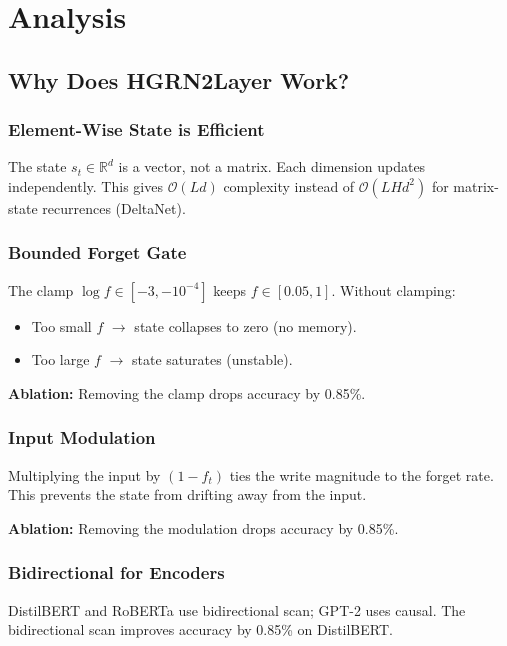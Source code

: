 \section{Analysis}

\subsection{Why Does HGRN2Layer Work?}

\subsubsection{Element-Wise State is Efficient}

The state $s_t \in \mathbb{R}^d$ is a vector, not a matrix. Each dimension 
updates independently. This gives $\mathcal{O}(L d)$ complexity instead of 
$\mathcal{O}(L H d^2)$ for matrix-state recurrences (DeltaNet).

\subsubsection{Bounded Forget Gate}

The clamp $\log f \in [-3, -10^{-4}]$ keeps $f \in [0.05, 1]$. Without 
clamping:

\begin{itemize}
\item Too small $f$ $\to$ state collapses to zero (no memory).
\item Too large $f$ $\to$ state saturates (unstable).

\end{itemize}
\textbf{Ablation:} Removing the clamp drops accuracy by 0.85\%.

\subsubsection{Input Modulation}

Multiplying the input by $(1 - f_t)$ ties the write magnitude to the forget 
rate. This prevents the state from drifting away from the input.

\textbf{Ablation:} Removing the modulation drops accuracy by 0.85\%.

\subsubsection{Bidirectional for Encoders}

DistilBERT and RoBERTa use bidirectional scan; GPT-2 uses causal. The 
bidirectional scan improves accuracy by 0.85\% on DistilBERT.


